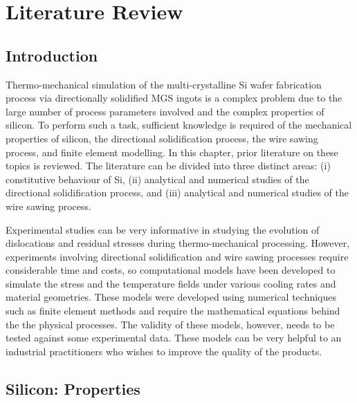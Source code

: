 \chapter{Literature Review}
\section{Introduction}
Thermo-mechanical simulation of the multi-crystalline Si wafer fabrication process via directionally solidified MGS ingots is a complex problem due to the large number of process parameters involved and the complex properties of silicon. To perform such a task, sufficient knowledge is required of the mechanical properties of silicon, the directional solidification process, the wire sawing process, and finite element modelling. In this chapter, prior literature on these topics is reviewed. The literature can be divided into three distinct areas: (i) constitutive behaviour of Si, (ii) analytical and numerical studies of the directional solidification process, and (iii) analytical and numerical studies of the wire sawing process. 

Experimental studies can be very informative in studying the evolution of dislocations and residual stresses during thermo-mechanical processing. However, experiments involving directional solidification and wire sawing processes require considerable time and costs, so computational models have been developed to simulate the stress and the temperature fields under various cooling rates and material geometries. These models were developed using numerical techniques such as finite element methods and require the mathematical equations behind the the physical processes. The validity of these models, however, needs to be tested against some experimental data. These models can be very helpful to an industrial practitioners who wishes to improve the quality of the products.

\section{Silicon: Properties}
